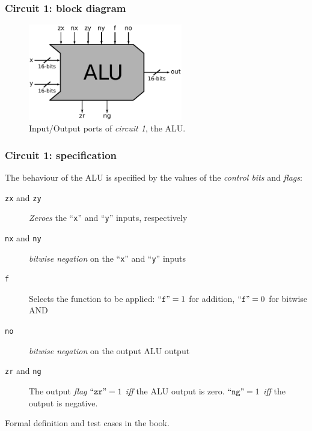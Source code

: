 \documentclass{beamer}
\begin{document}
            \begin{frame}
                \frametitle{Circuit 1: block diagram}

                \begin{figure}[h!]
                    \centerline{\includegraphics[width=0.6\textwidth]{imgs/alu-block.pdf}}
                    \caption{Input/Output ports of \emph{circuit 1}, the ALU.
                        \label{fig:alu-block}}
                \end{figure}
            \end{frame}

            \begin{frame}
                \frametitle{Circuit 1: specification}

                \par{The behaviour of the ALU is specified by the values of the \emph{control bits} and \emph{flags}:}

                \begin{description}
                    \item[\texttt{zx} and \texttt{zy}]
                        \emph{Zeroes} the ``\texttt{x}'' and ``\texttt{y}'' inputs, respectively
                    \item[\texttt{nx} and \texttt{ny}]
                        \emph{bitwise negation} on the ``\texttt{x}'' and ``\texttt{y}'' inputs
                    \item[\texttt{f}]
                        Selects the function to be applied: \newline
                        $\text{``\texttt{f}''} = 1$ for addition, $\text{``\texttt{f}''} = 0$ for bitwise AND
                    \item[\texttt{no}]
                        \emph{bitwise negation} on the output ALU output
                    \item[\texttt{zr} and \texttt{ng}]
                        The output \emph{flag} $\text{``\texttt{zr}''} = 1$ \emph{iff} the ALU output is zero.
                        $\text{``\texttt{ng}''} = 1$ \emph{iff} the output is negative.
                \end{description}

                \par{Formal definition and test cases in the book.}
            \end{frame}
\end{document}
